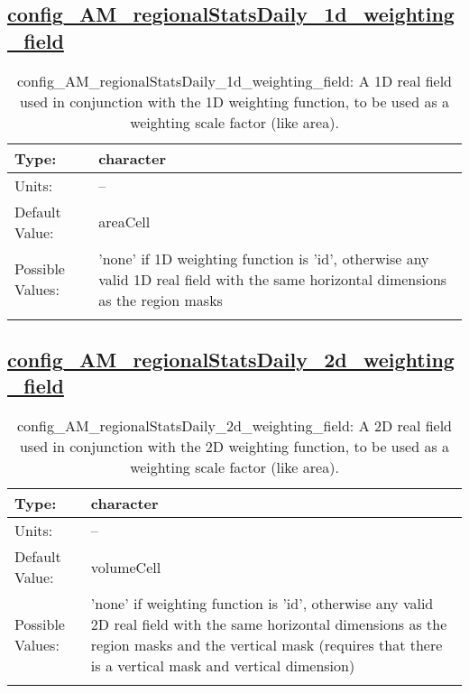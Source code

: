 \subsection[config\_AM\_regionalStatsDaily\_1d\_weighting\_field]{\hyperref[sec:nm_tab_AM_regionalStatsDaily]{config\_AM\_regionalStatsDaily\_1d\_weighting\_field}}
\label{subsec:nm_sec_config_AM_regionalStatsDaily_1d_weighting_field}
\begin{center}
\begin{longtable}{| p{2.0in} || p{4.0in} |}
    \hline
    Type: & character \\
    \hline
    Units: & -- \\
    \hline
    Default Value: & areaCell \\
    \hline
    Possible Values: & 'none' if 1D weighting function is 'id', otherwise any valid 1D real field with the same horizontal dimensions as the region masks \\
    \hline
    \caption{config\_AM\_regionalStatsDaily\_1d\_weighting\_field: A 1D real field used in conjunction with the 1D weighting function, to be used as a weighting scale factor (like area).}
\end{longtable}
\end{center}
\subsection[config\_AM\_regionalStatsDaily\_2d\_weighting\_field]{\hyperref[sec:nm_tab_AM_regionalStatsDaily]{config\_AM\_regionalStatsDaily\_2d\_weighting\_field}}
\label{subsec:nm_sec_config_AM_regionalStatsDaily_2d_weighting_field}
\begin{center}
\begin{longtable}{| p{2.0in} || p{4.0in} |}
    \hline
    Type: & character \\
    \hline
    Units: & -- \\
    \hline
    Default Value: & volumeCell \\
    \hline
    Possible Values: & 'none' if weighting function is 'id', otherwise any valid 2D real field with the same horizontal dimensions as the region masks and the vertical mask (requires that there is a vertical mask and vertical dimension) \\
    \hline
    \caption{config\_AM\_regionalStatsDaily\_2d\_weighting\_field: A 2D real field used in conjunction with the 2D weighting function, to be used as a weighting scale factor (like area).}
\end{longtable}
\end{center}
